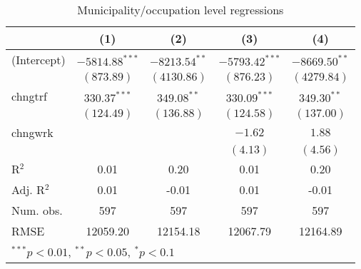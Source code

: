 
\begin{table}
\caption{Municipality/occupation level regressions}
\begin{center}
\begin{tabular}{l c c c c }
\hline
 & (1) & (2) & (3) & (4) \\
\hline
(Intercept) & $-5814.88^{***}$ & $-8213.54^{**}$ & $-5793.42^{***}$ & $-8669.50^{**}$ \\
            & $(873.89)$       & $(4130.86)$     & $(876.23)$       & $(4279.84)$     \\
chngtrf     & $330.37^{***}$   & $349.08^{**}$   & $330.09^{***}$   & $349.30^{**}$   \\
            & $(124.49)$       & $(136.88)$      & $(124.58)$       & $(137.00)$      \\
chngwrk     &                  &                 & $-1.62$          & $1.88$          \\
            &                  &                 & $(4.13)$         & $(4.56)$        \\
\hline
R$^2$       & 0.01             & 0.20            & 0.01             & 0.20            \\
Adj. R$^2$  & 0.01             & -0.01           & 0.01             & -0.01           \\
Num. obs.   & 597              & 597             & 597              & 597             \\
RMSE        & 12059.20         & 12154.18        & 12067.79         & 12164.89        \\
\hline
\multicolumn{5}{l}{\scriptsize{$^{***}p<0.01$, $^{**}p<0.05$, $^*p<0.1$}}
\end{tabular}
\label{table:coefficients}
\end{center}
\end{table}
